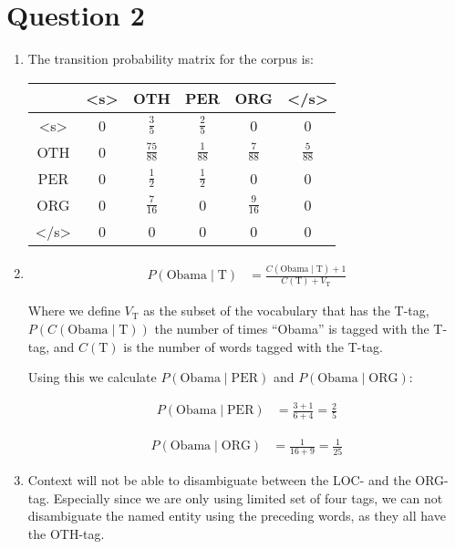 \documentclass[a4paper]{article}
\begin{document}
\section*{Question 2}
\begin{enumerate}
    \item The transition probability matrix for the corpus is:

        \begin{tabular}{c|ccccc}
            & <s> & OTH & PER & ORG & </s>\\\hline
            <s>& 0&$\frac{3}{5}$&$\frac{2}{5}$&0&0\\
            OTH&
            0&$\frac{75}{88}$&$\frac{1}{88}$&$\frac{7}{88}$&$\frac{5}{88}$\\
            PER& 0&$\frac{1}{2}$&$\frac{1}{2}$&0&0\\
            ORG& 0&$\frac{7}{16}$&0&$\frac{9}{16}$&0\\
            </s>&0&0&0&0&0\\
        \end{tabular}

    \item

        \begin{align}
            P(\text{Obama}\mid\text{T}) &= \frac{C(\text{Obama} \mid
            \text{T}) + 1}{C(\text{T}) + V_{\text{T}}}
        \end{align}

        Where we define $V_{\text{T}}$ as the subset of the vocabulary that has
        the T-tag, $P(C(\text{Obama}\mid\text{T}))$ the number of times
        ``Obama'' is tagged with the T-tag, and $C(\text{T})$ is the number of
        words tagged with the T-tag.

        Using this we calculate  $P(\text{Obama}\mid\text{PER})$ and $P(\text{Obama}\mid\text{ORG})$:

        \begin{align}
            P(\text{Obama}\mid\text{PER}) &=\frac{3+1}{6+4} = \frac{2}{5}
        \end{align}


        \begin{align}
            P(\text{Obama}\mid\text{ORG}) &=\frac{1}{16+9} = \frac{1}{25}
        \end{align}

    \item Context will not be able to disambiguate between the LOC- and the
        ORG-tag. Especially since we are only using limited set of four tags, we
        can not disambiguate the named entity using the preceding words, as they
        all have the OTH-tag.


\end{enumerate}
\end{document}
